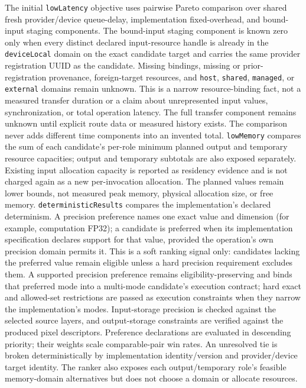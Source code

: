\documentclass[11pt,a4paper,oneside]{article}
\begin{document}
The initial \texttt{lowLatency} objective uses pairwise Pareto comparison over shared fresh provider/device queue-delay, implementation fixed-overhead, and bound-input staging components. The bound-input staging component is known zero only when every distinct declared input-resource handle is already in the \texttt{deviceLocal} domain on the exact candidate target and carries the same provider registration UUID as the candidate. Missing bindings, missing or prior-registration provenance, foreign-target resources, and \texttt{host}, \texttt{shared}, \texttt{managed}, or \texttt{external} domains remain unknown. This is a narrow resource-binding fact, not a measured transfer duration or a claim about unrepresented input values, synchronization, or total operation latency. The full transfer component remains unknown until explicit route data or measured history exists. The comparison never adds different time components into an invented total. \texttt{lowMemory} compares the sum of each candidate's per-role minimum planned output and temporary resource capacities; output and temporary subtotals are also exposed separately. Existing input allocation capacity is reported as residency evidence and is not charged again as a new per-invocation allocation. The planned values remain lower bounds, not measured peak memory, physical allocation size, or free memory. \texttt{deterministicResults} compares the implementation's declared determinism. A precision preference names one exact value and dimension (for example, computation FP32); a candidate is preferred when its implementation specification declares support for that value, provided the operation's own precision domain permits it. This is a soft ranking signal only: candidates lacking the preferred value remain eligible unless a hard precision requirement excludes them. A supported precision preference remains eligibility-preserving and binds that preferred mode into a multi-mode candidate's execution contract; hard exact and allowed-set restrictions are passed as execution constraints when they narrow the implementation's modes. Input-storage precision is checked against the selected source layers, and output-storage constraints are verified against the produced pixel descriptors. Preference declarations are evaluated in descending priority; their weights scale comparable-pair win rates. An unresolved tie is broken deterministically by implementation identity/version and provider/device target identity. The ranker also exposes each output/temporary role's feasible memory-domain alternatives but does not choose a domain or allocate resources.
\end{document}
